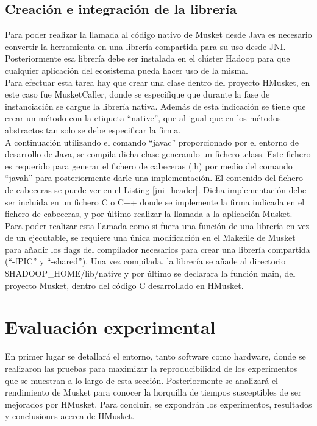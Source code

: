 \documentclass[conference]{IEEEtran}
\begin{document}
\subsection{Creación e integración de la librería}
Para poder realizar la llamada al código nativo de Musket desde Java es necesario convertir la herramienta en una librería compartida para su uso desde JNI. Posteriormente esa librería debe ser instalada en el clúster Hadoop para que cualquier aplicación del ecosistema pueda hacer uso de la misma.\\
Para efectuar esta tarea hay que crear una clase dentro del proyecto HMusket, en este caso fue MusketCaller, donde se especifique que durante la fase de instanciación se cargue la librería nativa. Además de esta indicación se tiene que crear un método con la etiqueta ``native'', que al igual que en los métodos abstractos tan solo se debe especificar la firma.\\
A continuación utilizando el comando ``javac'' proporcionado por el entorno de desarrollo de Java, se compila dicha clase generando un fichero .class. Este fichero es requerido para generar el fichero de cabeceras (.h) por medio del comando ``javah'' para posteriormente darle una implementación. El contenido del fichero de cabeceras se puede ver en el Listing \ref{jni_header}. Dicha implementación debe ser incluida en un fichero C o C++ donde se implemente la firma indicada en el fichero de cabeceras, y por último realizar la llamada a la aplicación Musket.\\
Para poder realizar esta llamada como si fuera una función de una librería en vez de un ejecutable, se requiere una única modificación en el Makefile de Musket para añadir los flags del compilador necesarios para crear una librería compartida (``-fPIC'' y ``-shared''). Una vez compilada, la librería se añade al directorio \$HADOOP\_HOME/lib/native y por último se declarara la función main, del proyecto Musket, dentro del código C desarrollado en HMusket.

\section{Evaluación experimental}
En primer lugar se detallará el entorno, tanto software como hardware, donde se realizaron las pruebas para maximizar la reproducibilidad de los experimentos que se muestran a lo largo de esta sección. Posteriormente se analizará el rendimiento de Musket para conocer la horquilla de tiempos susceptibles de ser mejorados por HMusket. Para concluir, se expondrán los experimentos, resultados y conclusiones acerca de HMusket.
\end{document}
